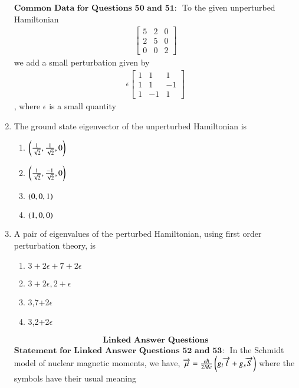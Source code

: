 \documentclass[journal]{IEEEtran}
\begin{document}
\begin{enumerate}[start=40]
\begin{enumerate}
\end{enumerate}
$\textbf{Common Data for Questions 50 and 51: }$ To the given unperturbed Hamiltonian 
\begin{align*}
\begin{bmatrix}
5 & 2 & 0 \\
2 & 5 & 0 \\
0 & 0 & 2
\end{bmatrix}
\end{align*} we add a small perturbation given by 
\begin{align*}
\epsilon
    \begin{bmatrix}
1 & 1 & 1 \\
1 & 1 & -1 \\
1 & -1 & 1
\end{bmatrix}
\end{align*}, where $\epsilon$ is a small quantity
\bigskip
\item The ground state eigenvector of the unperturbed Hamiltonian is
\begin{multicols}{4}
    \begin{enumerate}
        \item $\left(\frac{1}{\sqrt{2}},\frac{1}{\sqrt{2}},0\right)$
        \item $\left(\frac{1}{\sqrt{2}},\frac{-1}{\sqrt{2}},0\right)$
        \item $\left(0,0,1\right)$
        \item $\left(1,0,0\right)$
    \end{enumerate}
\end{multicols}
\item A pair of eigenvalues of the perturbed Hamiltonian, using first order perturbation theory, is 
\begin{multicols}{4}
    \begin{enumerate}
        \item $3+2\epsilon+7+2\epsilon$
        \item $3+2\epsilon,2+\epsilon$
        \item 3,7+2$\epsilon$
        \item 3,2+2$\epsilon$
    \end{enumerate}
\end{multicols}
\bigskip
$$\textbf{Linked Answer Questions}$$
$\textbf{Statement for Linked Answer Questions 52 and 53: }$
\bigskip In the Schmidt model of nuclear magnetic moments,
we have, $\overrightarrow{\mu}=\frac{e\hbar}{2Mc}\left(g_{l}\overrightarrow{l}+g_{s}\overrightarrow{S}\right)$ where the symbols have their usual meaning 
\bigskip

\end{enumerate}
\end{document}
